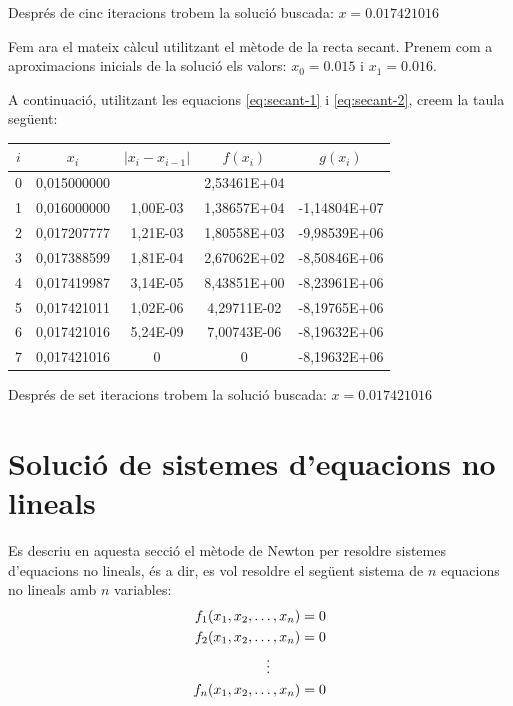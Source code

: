 \begin{exemple}
Després de cinc iteracions trobem la solució buscada: $x=\num{0,017421016}$

Fem ara el mateix càlcul utilitzant el mètode de la recta secant. Prenem com a  aproximacions inicials de la solució els valors: $x_0 = \num{0,015}$ i $x_1 = \num{0,016}$.

 A continuació, utilitzant les equacions \eqref{eq:secant-1} i \eqref{eq:secant-2}, creem la taula següent:

\begin{center}
   \centering
   \begin{tabular}{S[table-format=1.0]S[table-format=2.9]S[table-format=2.2e+2]
   S[table-format=2.5e+2]S[table-format=+3.5e+2]}
    & {$x_i$}  & {$|x_i - x_{i-1}|$} & {$f(x_i)$} & {$g(x_i)$} \\
   	&  0,015000000 & {}       & 2,53461E+04 & {}             \\
       1	&  0,016000000 & 1,00E-03 & 1,38657E+04 & -1,14804E+07 \\
       2	&  0,017207777 & 1,21E-03 & 1,80558E+03 & -9,98539E+06 \\
       3	&  0,017388599 & 1,81E-04 & 2,67062E+02 & -8,50846E+06 \\
       4	&  0,017419987 & 3,14E-05 & 8,43851E+00 & -8,23961E+06 \\
       5	&  0,017421011 & 1,02E-06 & 4,29711E-02 & -8,19765E+06 \\
       6	&  0,017421016 & 5,24E-09 & 7,00743E-06 & -8,19632E+06 \\
       7	&  0,017421016 & 0        & 0           & -8,19632E+06 \\
   \bottomrule[1pt]
   \end{tabular}
\end{center}


Després de set iteracions trobem la solució buscada: $x=\num{0,017421016}$


\end{exemple} 



\section{Solució de sistemes d'equacions  no lineals}\label{sec:sist-func-no-lin}

Es descriu en aquesta secció el mètode de Newton per resoldre sistemes d'equacions no lineals, és a dir, es vol resoldre el següent sistema de $n$ equacions no lineals amb $n$ variables:
\begin{align}
	f_1(x_1, x_2, \dots, x_n) & = 0 \notag\\
	f_2(x_1, x_2, \dots, x_n) & = 0 \notag\\
	\vdots{}\hspace{5ex} &{} \\
	f_n(x_1, x_2, \dots, x_n) & = 0	 \notag
\end{align}

